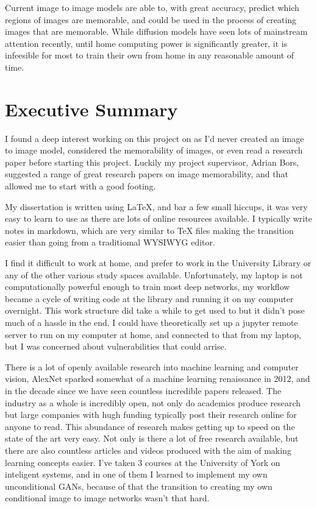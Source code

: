 \documentclass{UoYCSproject}
\begin{document}
Current image to image models are able to, with great accuracy, predict which regions of images are memorable, and could be used in the process of creating images that are memorable. While diffusion models have seen lots of mainstream attention recently, until home computing power is significantly greater, it is infeesible for most to train their own from home in any reasonable amount of time.

\chapter{Executive Summary}


I found a deep interest working on this project on as I'd never created an image to image model, considered the memorability of images, or even read a research paper before starting this project. Luckily my project supervisor, Adrian Bors, suggested a range of great research papers on image memorability, and that allowed me to start with a good footing.

My dissertation is written using LaTeX, and bar a few small hiccups, it was very easy to learn to use as there are lots of online resources available. I typically write notes in markdown, which are very similar to TeX files making the transition easier than going from a traditiomal WYSIWYG editor.

I find it difficult to work at home, and prefer to work in the University Library or any of the other various study spaces available. Unfortunately, my laptop is not computationally powerful enough to train most deep networks, my workflow became a cycle of writing code at the library and running it on my computer overnight. This work structure did take a while to get used to but it didn't pose much of a hassle in the end. I could have theoretically set up a jupyter remote server to run on my computer at home, and connected to that from my laptop, but I was concerned about vulnerabilities that could arrise.

There is a lot of openly available research into machine learning and computer vision, AlexNet sparked somewhat of a machine learning renaissance in 2012, and in the decade since we have seen countless incredible papers released. The industry as a whole is incredibly open, not only do academics produce research but large companies with hugh funding typically post their research online for anyone to read. This abundance of research makes getting up to speed on the state of the art very easy. Not only is there a lot of free research available, but there are also countless articles and videos produced with the aim of making learning concepts easier. I've taken 3 courses at the University of York on inteligent systems, and in one of them I learned to implement my own unconditional GANs, because of that the transition to creating my own conditional image to image networks wasn't that hard. 
\end{document}
